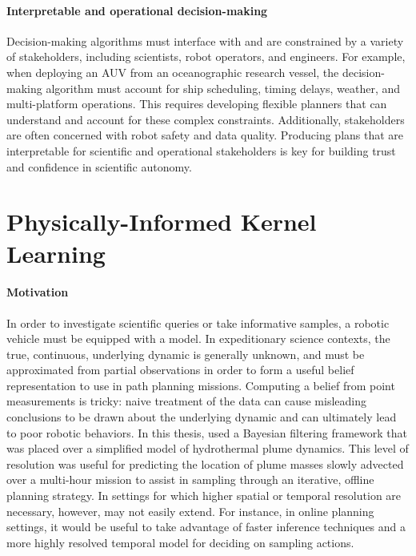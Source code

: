 \paragraph{Interpretable and operational decision-making}
Decision-making algorithms must interface with and are constrained by a variety of stakeholders, including scientists, robot operators, and engineers. For example, when deploying an AUV from an oceanographic research vessel, the decision-making algorithm must account for ship scheduling, timing delays, weather, and multi-platform operations. This requires developing flexible planners that can understand and account for these complex constraints\autocite{timmons2019automated}. Additionally, stakeholders are often concerned with robot safety and data quality. Producing plans that are interpretable for scientific and operational stakeholders is key for building trust and confidence in scientific autonomy. 



\section{Physically-Informed Kernel Learning}

\paragraph{Motivation}
In order to investigate scientific queries or take informative samples, a robotic vehicle must be equipped with a model.
In expeditionary science contexts, the true, continuous, underlying dynamic is generally unknown, and must be approximated from partial observations in order to form a useful belief representation to use in path planning missions.
Computing a belief from point measurements is tricky: naive treatment of the data can cause misleading conclusions to be drawn about the underlying dynamic and can ultimately lead to poor robotic behaviors.
In this thesis, \PHUMES used a Bayesian filtering framework that was placed over a simplified model of hydrothermal plume dynamics. This level of resolution was useful for predicting the location of plume masses slowly advected over a multi-hour mission to assist in sampling through an iterative, offline planning strategy.
In settings for which higher spatial or temporal resolution are necessary, however, \PHUMES may not easily extend.
For instance, in online planning settings, it would be useful to take advantage of faster inference techniques and a more highly resolved temporal model for deciding on sampling actions.

